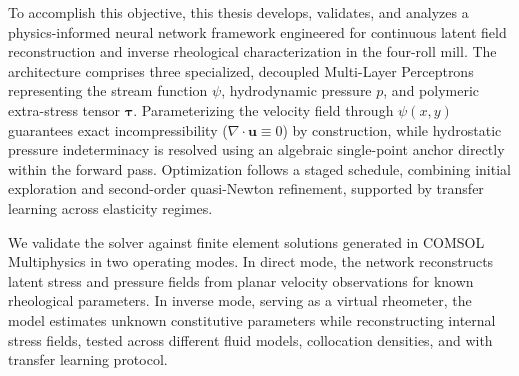 To accomplish this objective, this thesis develops, validates, and analyzes a
physics-informed neural network framework engineered for continuous latent field
reconstruction and inverse rheological characterization in the four-roll mill.
The architecture comprises three specialized, decoupled Multi-Layer Perceptrons
representing the stream function $\psi$, hydrodynamic pressure $p$, and
polymeric extra-stress tensor $\boldsymbol{\tau}$. Parameterizing the velocity
field through $\psi(x, y)$ guarantees exact incompressibility
($\nabla \cdot \boldsymbol{u} \equiv 0$) by construction, while hydrostatic
pressure indeterminacy is resolved using an algebraic single-point anchor directly
within the forward pass. Optimization follows a staged schedule, combining initial
exploration and second-order quasi-Newton refinement, supported by transfer
learning across elasticity regimes.

We validate the solver against finite element solutions generated in COMSOL
Multiphysics \cite{comsol_multiphysics} in two operating modes. In direct mode,
the network reconstructs latent stress and pressure fields from planar velocity
observations for known rheological parameters. In inverse mode, serving as a
virtual rheometer, the model estimates unknown constitutive parameters while
reconstructing internal stress fields, tested across different fluid models,
collocation densities, and with transfer learning protocol.
